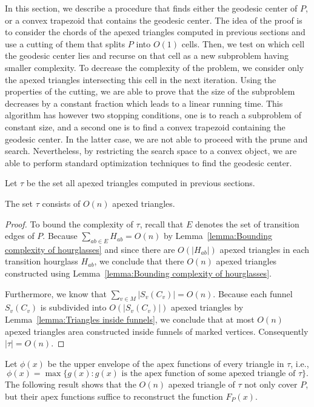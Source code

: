 \documentclass[a4paper,UKenglish]{lipics}
\newcommand{\F}[2]{\ensuremath{F_{\scriptscriptstyle #1}(#2)}}
\newcommand{\fn}[2]{\ensuremath{S_{\scriptscriptstyle #1}(#2)}}
\begin{document}
In this section, we describe a procedure that finds either the geodesic center of $P$, or a convex trapezoid that contains the geodesic center.
The idea of the proof is to consider the chords of the apexed triangles computed in previous sections and use a cutting of them that splits $P$ into $O(1)$ cells. Then, we test on which cell the geodesic center lies and recurse on that cell as a new subproblem having smaller complexity. To decrease the complexity of the problem, we consider only the apexed triangles intersecting this cell in the next iteration. Using the properties of the cutting, we are able to prove that the size of the subproblem decreases by a constant fraction which leads to a linear running time. This algorithm has however two stopping conditions, one is to reach a subproblem of constant size, and a second one is to find a convex trapezoid containing the geodesic center. In the latter case, we are not able to proceed with the prune and search. Nevertheless, by restricting the search space to a convex object, we are able to perform standard optimization techniques to find the geodesic center.


Let $\tau$ be the set all apexed triangles computed in previous sections. 

\begin{lemma}\label{lemma:Size of tau}
The set $\tau$ consists of $O(n)$ apexed triangles.
\end{lemma}
\begin{proof}
To bound the complexity of $\tau$, recall that $E$ denotes the set of transition edges of $P$.
Because $\sum_{ab\in E} H_{ab} = O(n)$ by Lemma~\ref{lemma:Bounding complexity of hourglasses} and since there are $O(|H_{ab}|)$ apexed triangles in each transition hourglass $H_{ab}$, we conclude that there $O(n)$ apexed triangles constructed using Lemma~\ref{lemma:Bounding complexity of hourglasses}.

Furthermore, we know that $\sum_{v\in M} |\fn{v}{C_v}| = O(n)$. Because each funnel $\fn{v}{C_v}$ is subdivided into $O(|\fn{v}{C_v}|)$ apexed triangles by Lemma~\ref{lemma:Triangles inside funnels}, we conclude that at most $O(n)$ apexed triangles area constructed inside funnels of marked vertices. Consequently $|\tau| = O(n)$.
\end{proof}




Let $\phi(x)$ be the upper envelope of the apex functions of every triangle in $\tau$, i.e., $$\phi(x) = \max\{g(x) : g(x)\text{ is the apex function of some apexed triangle of }\tau\}.$$
The following result shows that the $O(n)$ apexed triangle of $\tau$ not only cover $P$, but their apex functions suffice to reconstruct the function $\F{P}{x}$.
\end{document}
